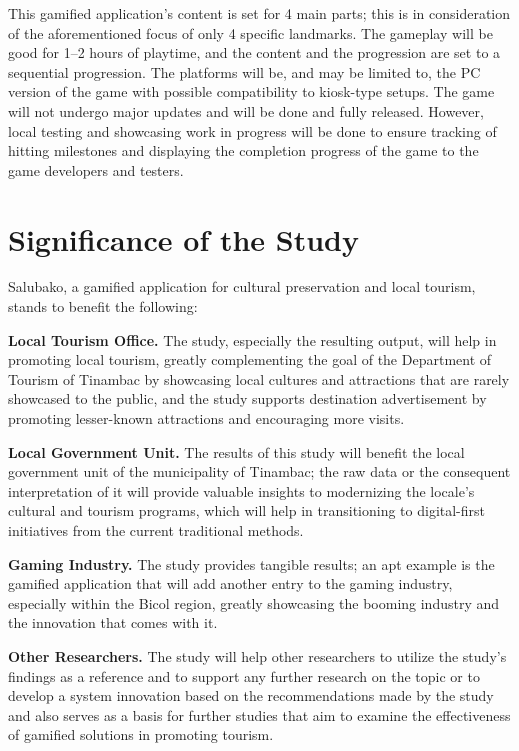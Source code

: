\documentclass{research}
\begin{document}
This gamified application's content is set for 4 main parts; this is in consideration
of the aforementioned focus of only 4 specific landmarks. The gameplay will be good for
1--2 hours of playtime, and the content and the progression are set to a sequential
progression. The platforms will be, and may be limited to, the PC version of the game
with possible compatibility to kiosk-type setups. The game will not undergo major
updates and will be done and fully released. However, local testing and showcasing work
in progress will be done to ensure tracking of hitting milestones and displaying the
completion progress of the game to the game developers and testers.

\section{Significance of the Study}

Salubako, a gamified application for cultural preservation and local tourism, stands to
benefit the following:

\textbf{Local Tourism Office.} The study, especially the resulting output, will help in
promoting local tourism, greatly complementing the goal of the Department of Tourism of
Tinambac by showcasing local cultures and attractions that are rarely showcased to the
public, and the study supports destination advertisement by promoting lesser-known
attractions and encouraging more visits.

\textbf{Local Government Unit.} The results of this study will benefit the local
government unit of the municipality of Tinambac; the raw data or the consequent
interpretation of it will provide valuable insights to modernizing the locale's cultural
and tourism programs, which will help in transitioning to digital-first initiatives from
the current traditional methods.

\textbf{Gaming Industry.} The study provides tangible results; an apt example is the
gamified application that will add another entry to the gaming industry, especially
within the Bicol region, greatly showcasing the booming industry and the innovation
that comes with it.

\textbf{Other Researchers.} The study will help other researchers to utilize the
study's findings as a reference and to support any further research on the topic or to
develop a system innovation based on the recommendations made by the study and also
serves as a basis for further studies that aim to examine the effectiveness of gamified
solutions in promoting tourism.
\end{document}
